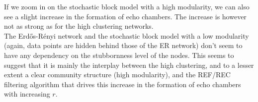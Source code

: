 \documentclass[11 pt , letterpaper , twoside , openright]{book}
\begin{document}
If we zoom in on the stochastic block model with a high modularity, we can also see a slight increase in the formation of echo chambers. The increase is however not as strong as for the high clustering networks.\\
\newline
The Erd\H{o}s-R\'{e}nyi network and the stochastic block model with a low modularity (again, data points are hidden behind those of the ER network) don't seem to have any dependency on the stubbornness level of the nodes. This seems to suggest that it is mainly the interplay between the high clustering, and to a lesser extent a clear community structure (high modularity), and the REF/REC filtering algorithm that drives this increase in the formation of echo chambers with increasing $r$. %
\end{document}
